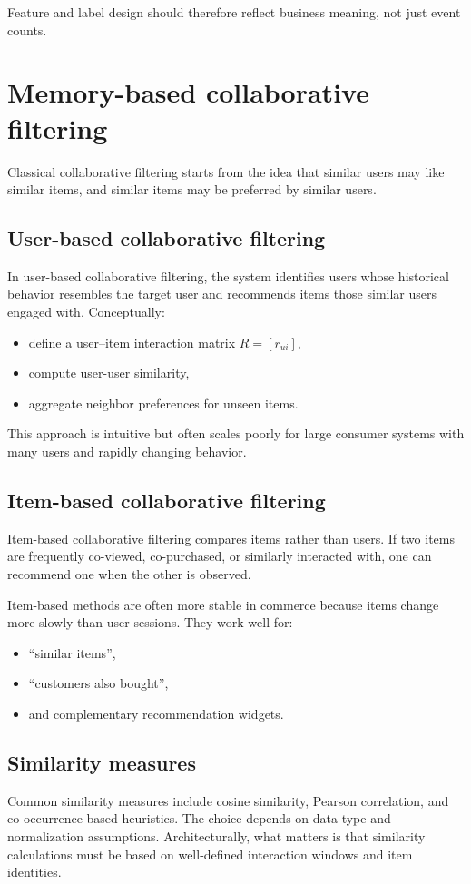 Feature and label design should therefore reflect business meaning, not just event counts.

\section{Memory-based collaborative filtering}
Classical collaborative filtering starts from the idea that similar users may like similar items, and similar items may be preferred by similar users.

\subsection{User-based collaborative filtering}
In user-based collaborative filtering, the system identifies users whose historical behavior resembles the target user and recommends items those similar users engaged with.
Conceptually:
\begin{itemize}
  \item define a user--item interaction matrix $R=[r_{ui}]$,
  \item compute user-user similarity,
  \item aggregate neighbor preferences for unseen items.
\end{itemize}

This approach is intuitive but often scales poorly for large consumer systems with many users and rapidly changing behavior.

\subsection{Item-based collaborative filtering}
Item-based collaborative filtering compares items rather than users.
If two items are frequently co-viewed, co-purchased, or similarly interacted with, one can recommend one when the other is observed.

Item-based methods are often more stable in commerce because items change more slowly than user sessions.
They work well for:
\begin{itemize}
  \item ``similar items'',
  \item ``customers also bought'',
  \item and complementary recommendation widgets.
\end{itemize}

\subsection{Similarity measures}
Common similarity measures include cosine similarity, Pearson correlation, and co-occurrence-based heuristics.
The choice depends on data type and normalization assumptions.
Architecturally, what matters is that similarity calculations must be based on well-defined interaction windows and item identities.

